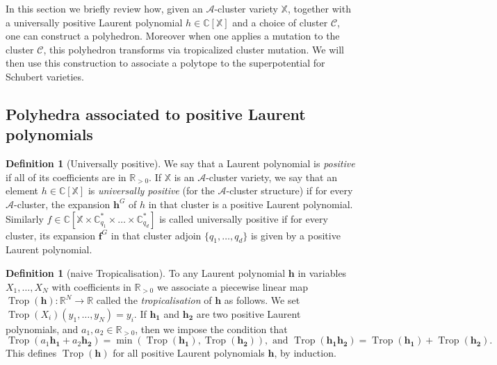 \documentclass{amsart}
\theoremstyle{definition}
\newtheorem{definition}[thm]{Definition}
\numberwithin{equation}{section}
\newcommand{\R}{\mathbb R}
\newcommand{\C}{\mathbb{C}}
\renewcommand{\min}{{\operatorname{min}}}
\newcommand{\Trop}{\operatorname{Trop}}
\begin{document}
In this section we briefly review how, given an 
$\mathcal{A}$-cluster variety $\mathbb X$, together with 
a universally positive Laurent polynomial 
	$h\in\C[\mathbb{X}]$ 
 and a choice of cluster $\mathcal{C}$, one 
can construct a polyhedron.  Moreover when one applies a mutation to the cluster $\mathcal{C}$,
this polyhedron transforms via tropicalized cluster mutation.  
We will then use this construction to associate a polytope to the superpotential for Schubert 
varieties.

\subsection{Polyhedra associated to positive Laurent polynomials}

\begin{definition}[Universally positive]\label{d:universallypositive}
We say that a Laurent polynomial is \emph{positive} if all of its coefficients are in $\R_{>0}$. 
	If $\mathbb{X}$ is an $\mathcal A$-cluster variety, we say that an element 
	$h\in\C[\mathbb{X}]$ 
	is  {\it universally positive}  (for the $\mathcal A$-cluster structure) if for every $\mathcal A$-cluster,
	 the expansion $\mathbf h^G$ of $h$ in that cluster is a positive Laurent polynomial. Similarly 
	$f\in\C[\mathbb{X}\times\C_{q_1}^* \times \dots \times \C_{q_d}^*]$ is called universally positive if for every cluster, its expansion $\mathbf f^G$ in that cluster adjoin $\{q_1,\dots,q_d\}$ 
	is given by a positive Laurent polynomial. 
\end{definition}





\begin{definition}[naive Tropicalisation]\label{def:Tropicalisation}
To any Laurent polynomial $\mathbf h$ in variables $X_1,\dotsc, X_N$ with coefficients in $\R_{>0}$ we associate a piecewise linear map $\Trop(\mathbf{h}):\R^N \to \R$
 called the {\it tropicalisation} of $\mathbf h$ as follows. We set $\Trop(X_i)(y_1,\dotsc, y_N)=y_i$. If $\mathbf{h_1}$ and $\mathbf{h_2}$     are two positive Laurent polynomials, and $a_1,a_2\in\R_{>0}$, then we impose the condition that
\begin{equation}\label{eq:min-etc}
\Trop(a_1\mathbf{h_1}+a_2\mathbf{h_2}) = 
\min(\Trop(\mathbf{h_1}),\Trop(\mathbf{h_2})),\text{ and }
\Trop(\mathbf{h_1}\mathbf{h_2}) = 
\Trop(\mathbf{h_1}) + \Trop(\mathbf{h_2}).
\end{equation}
This defines $\Trop(\mathbf h)$ for all positive Laurent polynomials $\mathbf h$, by induction.
\end{definition}
\end{document}
